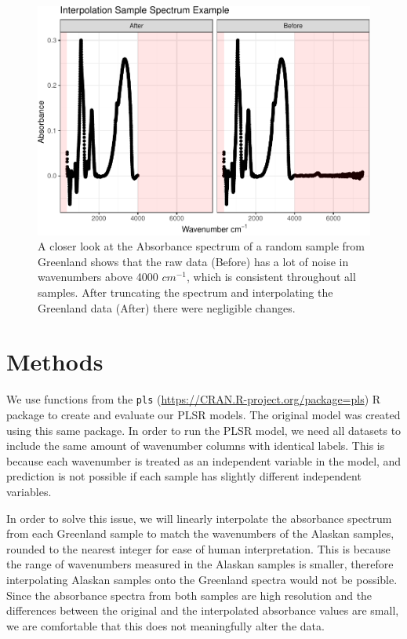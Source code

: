 \documentclass[water,article,submit,moreauthors,pdftex]{mdpi}
\begin{document}
\begin{figure}

{\centering \includegraphics{final_paper_draft_files/figure-latex/fig3-1} 

}

\caption{A closer look at the Absorbance spectrum of a random sample from Greenland shows that the raw data (Before) has a lot of noise in wavenumbers above 4000 $cm^{-1}$, which is consistent throughout all samples. After truncating the spectrum and interpolating the Greenland data (After) there were negligible changes.}\label{fig:fig3}
\end{figure}

\hypertarget{methods}{%
\section{Methods}\label{methods}}

We use functions from the \texttt{pls}
(\url{https://CRAN.R-project.org/package=pls}) R package to create and
evaluate our PLSR models. The original model was created using this same
package. In order to run the PLSR model, we need all datasets to include
the same amount of wavenumber columns with identical labels. This is
because each wavenumber is treated as an independent variable in the
model, and prediction is not possible if each sample has slightly
different independent variables.

In order to solve this issue, we will linearly interpolate the
absorbance spectrum from each Greenland sample to match the wavenumbers
of the Alaskan samples, rounded to the nearest integer for ease of human
interpretation. This is because the range of wavenumbers measured in the
Alaskan samples is smaller, therefore interpolating Alaskan samples onto
the Greenland spectra would not be possible. Since the absorbance
spectra from both samples are high resolution and the differences
between the original and the interpolated absorbance values are small,
we are comfortable that this does not meaningfully alter the data.
\end{document}
